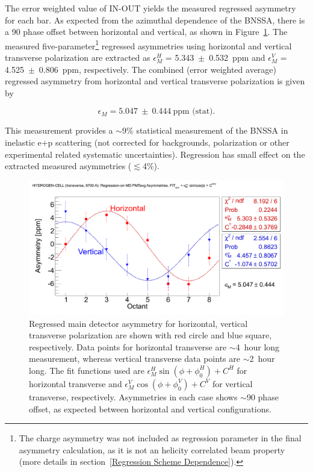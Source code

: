 The error weighted value of IN-OUT yields the measured regressed asymmetry for each bar. As expected from the azimuthal dependence of the BNSSA, there is a 90\degrees{} phase offset between horizontal and vertical, as shown in Figure~\ref{fig:asymmetry_H2}. The measured five-parameter\footnote{The charge asymmetry was not included as regression parameter in the final asymmetry calculation, as it is not an helicity correlated beam property (more details in section~\ref{Regression Scheme Dependence}).} regressed asymmetries using horizontal and vertical transverse polarization are extracted as $\epsilon_{M}^{H}$ = 5.343~$\pm$~0.532~ppm and  $\epsilon_{M}^{V}$ = 4.525~$\pm$~0.806~ppm, respectively. The combined (error weighted average) regressed asymmetry from horizontal and vertical transverse polarization is given by

\begin{equation} \label{equ:asymmetryMeasured}
\epsilon_{M} = 5.047~\pm~0.444~\text{ppm (stat)}.
\end{equation}

This measurement provides a $\sim$9\% statistical measurement of the BNSSA in inelastic e+p scattering (not corrected for backgrounds, polarization or other experimental related systematic uncertainties). Regression has small effect on the extracted measured asymmetries ($\lesssim$4\%).

\begin{figure}[!h]
	\begin{center}
	\includegraphics[width=15.0cm]{figures/asymmetry_H2}
	\end{center}
	\caption
	{Regressed main detector asymmetry for horizontal, vertical transverse polarization are shown with red circle and blue square, respectively. Data points for horizontal transverse are $\sim$4~hour long measurement, whereas vertical transverse data points are $\sim$2~hour long. The fit functions used are $\epsilon_{M}^{H} \sin(\phi + \phi_{0}^{H}) + C^{H}$ for horizontal transverse and $\epsilon_{M}^{V} \cos(\phi + \phi_{0}^{V}) + C^{V}$ for vertical transverse, respectively. Asymmetries in each case shows $\sim$90\degrees{} phase offset, as expected between horizontal and vertical configurations.}
	\label{fig:asymmetry_H2}
\end{figure}

